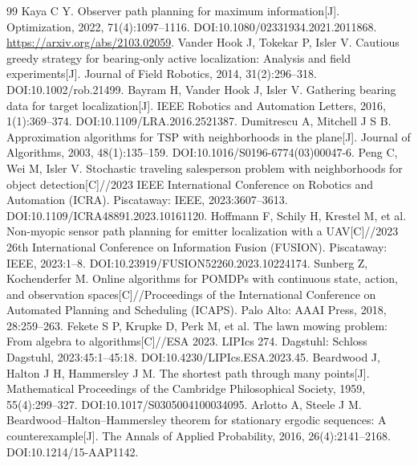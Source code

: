 \documentclass[UTF8,a4paper,zihao=-4,fontset=fandol]{ctexart}
\begin{document}
\begin{thebibliography}{99}\small\sloppy{}
 Kaya C Y. Observer path planning for maximum information[J]. Optimization, 2022, 71(4):1097--1116. DOI:10.1080/02331934.2021.2011868. \url{https://arxiv.org/abs/2103.02059}.
 Vander Hook J, Tokekar P, Isler V. Cautious greedy strategy for bearing-only active localization: Analysis and field experiments[J]. Journal of Field Robotics, 2014, 31(2):296--318. DOI:10.1002/rob.21499.
 Bayram H, Vander Hook J, Isler V. Gathering bearing data for target localization[J]. IEEE Robotics and Automation Letters, 2016, 1(1):369--374. DOI:10.1109/LRA.2016.2521387.
 Dumitrescu A, Mitchell J S B. Approximation algorithms for TSP with neighborhoods in the plane[J]. Journal of Algorithms, 2003, 48(1):135--159. DOI:10.1016/S0196-6774(03)00047-6.
 Peng C, Wei M, Isler V. Stochastic traveling salesperson problem with neighborhoods for object detection[C]//2023 IEEE International Conference on Robotics and Automation (ICRA). Piscataway: IEEE, 2023:3607--3613. DOI:10.1109/ICRA48891.2023.10161120.
 Hoffmann F, Schily H, Krestel M, et al. Non-myopic sensor path planning for emitter localization with a UAV[C]//2023 26th International Conference on Information Fusion (FUSION). Piscataway: IEEE, 2023:1--8. DOI:10.23919/FUSION52260.2023.10224174.
 Sunberg Z, Kochenderfer M. Online algorithms for POMDPs with continuous state, action, and observation spaces[C]//Proceedings of the International Conference on Automated Planning and Scheduling (ICAPS). Palo Alto: AAAI Press, 2018, 28:259--263.
 Fekete S P, Krupke D, Perk M, et al. The lawn mowing problem: From algebra to algorithms[C]//ESA 2023. LIPIcs 274. Dagstuhl: Schloss Dagstuhl, 2023:45:1--45:18. DOI:10.4230/LIPIcs.ESA.2023.45.
 Beardwood J, Halton J H, Hammersley J M. The shortest path through many points[J]. Mathematical Proceedings of the Cambridge Philosophical Society, 1959, 55(4):299--327. DOI:10.1017/S0305004100034095.
 Arlotto A, Steele J M. Beardwood--Halton--Hammersley theorem for stationary ergodic sequences: A counterexample[J]. The Annals of Applied Probability, 2016, 26(4):2141--2168. DOI:10.1214/15-AAP1142.
\end{thebibliography}
\label{mainbodyend}
\clearpage\appendix
\end{document}
